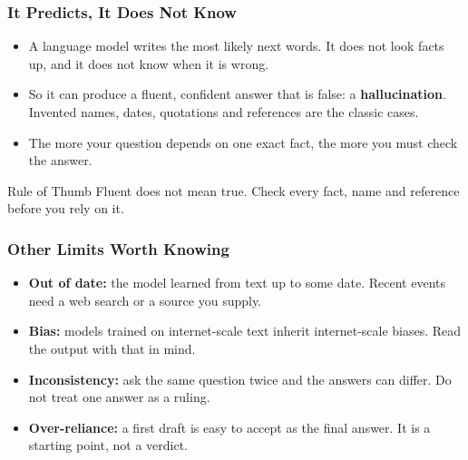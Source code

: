 
\begin{frame}[fragile]\frametitle{It Predicts, It Does Not Know}
\begin{itemize}
\item A language model writes the most likely next words. It does not look facts up, and it does not know when it is wrong.
\item So it can produce a fluent, confident answer that is false: a \textbf{hallucination}. Invented names, dates, quotations and references are the classic cases.
\item The more your question depends on one exact fact, the more you must check the answer.
\end{itemize}
\begin{alertblock}{Rule of Thumb}
Fluent does not mean true. Check every fact, name and reference before you rely on it.
\end{alertblock}
\end{frame}

\begin{frame}[fragile]\frametitle{Other Limits Worth Knowing}
\begin{itemize}
\item \textbf{Out of date:} the model learned from text up to some date. Recent events need a web search or a source you supply.
\item \textbf{Bias:} models trained on internet-scale text inherit internet-scale biases. Read the output with that in mind.
\item \textbf{Inconsistency:} ask the same question twice and the answers can differ. Do not treat one answer as a ruling.
\item \textbf{Over-reliance:} a first draft is easy to accept as the final answer. It is a starting point, not a verdict.
\end{itemize}
\end{frame}

